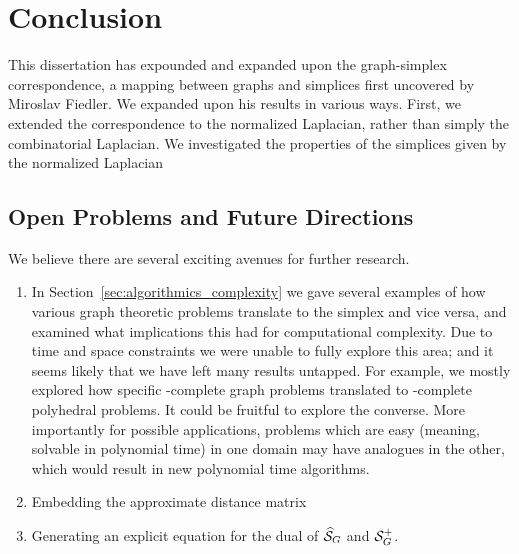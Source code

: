 \chapter{Conclusion}
\label{chap:conclusion}


This dissertation has expounded  and  expanded upon the graph-simplex correspondence, a mapping  between graphs and simplices  first uncovered by Miroslav Fiedler. 
We expanded upon his results in various ways. First, we extended the correspondence to the normalized Laplacian, rather than simply the combinatorial Laplacian. We investigated  the properties of the simplices given by the normalized Laplacian 


\section{Open Problems and Future Directions}
\label{sec:open_problems}

We believe there are several exciting  avenues for further  research. 
\begin{enumerate}
	\item In Section~\ref{sec:algorithmics_complexity} we gave several  examples of how various graph  theoretic problems translate to the simplex and vice  versa, and examined what implications this had for computational complexity. Due to time and space constraints we were unable to fully explore this area; and it seems likely that we have left many  results untapped.  For example, we mostly explored how specific \NP-complete graph problems translated to \NP-complete polyhedral problems. It could be fruitful to explore the converse. More importantly for possible applications, problems which are easy (meaning, solvable in polynomial time) in one domain may have analogues  in the other, which would result in new polynomial  time  algorithms. 
	\item Embedding the approximate distance matrix
	\item Generating an explicit equation for the dual of $\widehat{\mathcal{S}}_G$ and $\mathcal{S}_G^+$. 
\end{enumerate}

